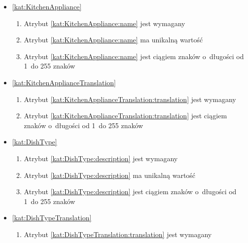 \begin{itemize}[label={\textbf{Ograniczenia dla}}, wide, labelwidth=!, labelindent=0pt]
    \item\ref{kat:KitchenAppliance}\mynobreakpar
    \begin{enumerate}[label={\textbf{OGR/2/\protect\twodigits{\arabic{enumi}}}}, wide, labelwidth=!, align=left, leftmargin=3cm, resume]
        \item Atrybut \ref{kat:KitchenAppliance:name} jest wymagany

        \item Atrybut \ref{kat:KitchenAppliance:name} ma unikalną wartość

        \item Atrybut \ref{kat:KitchenAppliance:name} jest ciągiem znaków o~długości od 1~do 255 znaków
    \end{enumerate}

    \item\ref{kat:KitchenApplianceTranslation}\mynobreakpar
    \begin{enumerate}[label={\textbf{OGR/2/\protect\twodigits{\arabic{enumi}}}}, wide, labelwidth=!, align=left, leftmargin=3cm, resume]
        \item Atrybut \ref{kat:KitchenApplianceTranslation:translation} jest wymagany

        \item Atrybut \ref{kat:KitchenApplianceTranslation:translation} jest ciągiem znaków o~długości od 1~do 255 znaków
    \end{enumerate}

    \item\ref{kat:DishType}\mynobreakpar
    \begin{enumerate}[label={\textbf{OGR/2/\protect\twodigits{\arabic{enumi}}}}, wide, labelwidth=!, align=left, leftmargin=3cm, resume]
        \item Atrybut \ref{kat:DishType:description} jest wymagany

        \item Atrybut \ref{kat:DishType:description} ma unikalną wartość

        \item Atrybut \ref{kat:DishType:description} jest ciągiem znaków o~długości od 1~do 255 znaków
    \end{enumerate}

    \item\ref{kat:DishTypeTranslation}\mynobreakpar
    \begin{enumerate}[label={\textbf{OGR/2/\protect\twodigits{\arabic{enumi}}}}, wide, labelwidth=!, align=left, leftmargin=3cm, resume]
        \item Atrybut \ref{kat:DishTypeTranslation:translation} jest wymagany


\end{enumerate}
\end{itemize}
